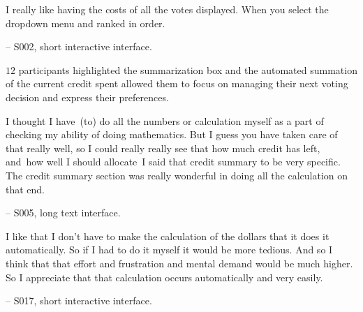 \begin{displayquote}
I really like having the costs of all the votes displayed. When you select the dropdown menu and ranked in order.

\noindent \hfill -- S002, short interactive interface.
\end{displayquote}

$12$ participants highlighted the summarization box and the automated summation of the current credit spent allowed them to focus on managing their next voting decision and express their preferences.

\begin{displayquote}
I thought I have~\bracketellipsis (to) do all the numbers or calculation myself as a part of checking my ability of doing mathematics. But I guess you have taken care of that really well, so I could really really see that how much credit has left, and~\bracketellipsis how well I should allocate~\bracketellipsis I said that credit summary to be very specific. The credit summary section was really wonderful in doing all the calculation on that end.

\noindent \hfill -- S005, long text interface.
\end{displayquote}

\begin{displayquote}
I like that I don't have to make the calculation of the dollars that it does it automatically. So if I had to do it myself it would be more tedious. And so I think that that effort and frustration and mental demand would be much higher. So I appreciate that that calculation occurs automatically and very easily. 

\noindent \hfill -- S017, short interactive interface.
\end{displayquote}





